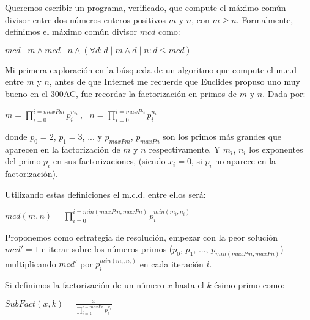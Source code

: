 \documentclass[12pt, a4paper, openany, fleqn]{book}
\begin{document}
    Queremos escribir un programa, verificado, que compute el máximo común divisor entre dos números enteros positivos $m$ y $n$,
    con $m \geqslant n$. Formalmente, definimos el máximo común divisor $mcd$ como:

    \begin{center}
        \begin{math}
            mcd \mid m \land mcd \mid n \land (\forall d: d \mid m \land d \mid n : d \leq mcd)
        \end{math}
    \end{center}

    Mi primera exploración en la búsqueda de un algoritmo que compute el m.c.d entre $m$ y $n$, antes de que Internet me recuerde que Euclides propuso uno muy bueno en el 300AC, fue recordar la factorización en primos de $m$ y $n$. Dada por:

    \begin{center}
        \begin{math}
            m = \prod_{i=0}^{i=maxPm} p_{i}^{m_i}\ , \ \ \ n = \prod_{i=0}^{i=maxPn} p_{i}^{n_i}
        \end{math}
    \end{center}

    donde $p_0=2$, $p_1= 3$, ... y $p_{maxPm}$, $p_{maxPn}$ son los primos más grandes que aparecen en la factorización de $m$ y $n$ respectivamente. Y $m_i$, $n_i$ los exponentes del primo $p_i$ en sus factorizaciones, (siendo $x_i=0$, si $p_i$ no aparece en la factorización).

    Utilizando estas definiciones el m.c.d. entre ellos será:

    \begin{center}
        \begin{math}
            mcd(m, n) = \prod_{i=0}^{i=min(maxPm, maxPn)} p_{i}^{min(m_i, n_i)}
        \end{math}
    \end{center}

    Proponemos como estrategia de resolución, empezar con la peor solución $mcd' = 1$ e iterar sobre los números primos ($p_0$, $p_1$, ..., $p_{min(maxPm, maxPn)}$) multiplicando $mcd'$ por $p_{i}^{min(m_{i}, n_{i})}$ en cada iteración $i$.

    Si definimos la factorización de un número $x$ hasta el $k$-ésimo primo como:
    \begin{center}
        \begin{math}
            SubFact(x, k) = \frac{x}{\prod_{i=k}^{i=maxPx} p_{i}^{x_i}} 
        \end{math}
    \end{center}
\end{document}
